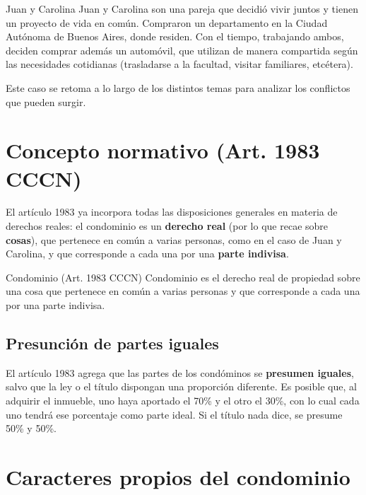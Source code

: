 \documentclass[12pt,oneside]{book}
\begin{document}
\begin{example}{Juan y Carolina}
Juan y Carolina son una pareja que decidió vivir juntos y tienen un proyecto de vida en común. Compraron un departamento en la Ciudad Autónoma de Buenos Aires, donde residen. Con el tiempo, trabajando ambos, deciden comprar además un automóvil, que utilizan de manera compartida según las necesidades cotidianas (trasladarse a la facultad, visitar familiares, etcétera).
\end{example}

Este caso se retoma a lo largo de los distintos temas para analizar los conflictos que pueden surgir.

\section{Concepto normativo (Art. 1983 CCCN)}

El artículo 1983 ya incorpora todas las disposiciones generales en materia de derechos reales: el condominio es un \textbf{derecho real} (por lo que recae sobre \textbf{cosas}), que pertenece en común a varias personas, como en el caso de Juan y Carolina, y que corresponde a cada una por una \textbf{parte indivisa}.

\begin{definition}{Condominio (Art. 1983 CCCN)}
Condominio es el derecho real de propiedad sobre una cosa que pertenece en común a varias personas y que corresponde a cada una por una parte indivisa.
\end{definition}

\subsection{Presunción de partes iguales}

El artículo 1983 agrega que las partes de los condóminos se \textbf{presumen iguales}, salvo que la ley o el título dispongan una proporción diferente. Es posible que, al adquirir el inmueble, uno haya aportado el 70\% y el otro el 30\%, con lo cual cada uno tendrá ese porcentaje como parte ideal. Si el título nada dice, se presume 50\% y 50\%.

\section{Caracteres propios del condominio}
\end{document}
